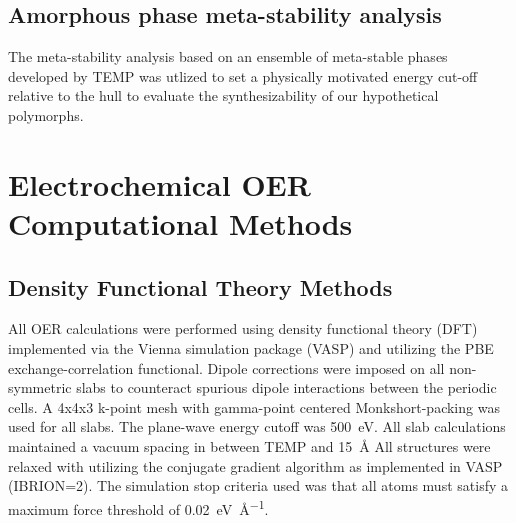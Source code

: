 



\subsection{Amorphous phase meta-stability analysis} %
%

%
The meta-stability analysis based on an ensemble of meta-stable phases developed by TEMP was utlized to set a physically motivated energy cut-off relative to the hull to evaluate the synthesizability of our hypothetical polymorphs.




\section{Electrochemical OER Computational Methods}  %
%

\subsection{Density Functional Theory Methods}  %
%
%
All OER calculations were performed using density functional theory (DFT) implemented via the Vienna  simulation package (VASP)
\cite{Kresse1995,Kresse1996_0,Kresse1996_1}
and utilizing the PBE exchange-correlation functional\cite{Perdew1996}.
%
Dipole corrections were imposed on all non-symmetric slabs to counteract spurious dipole interactions between the periodic cells.\cite{Neugebauer1992}
%
A 4x4x3 k-point mesh with gamma-point centered Monkshort-packing\cite{Monkhorst1976} was used for all slabs.
%
The plane-wave energy cutoff was \SI{500}{\electronvolt}.
%
All slab calculations maintained a vacuum spacing in between TEMP and \SI{15}{\angstrom}
%
All structures were relaxed with utilizing the conjugate gradient algorithm as implemented in VASP (IBRION\num{=2}).
%
The simulation stop criteria used was that all atoms must satisfy a maximum force threshold of \SI{0.02}{\electronvolt\per\angstrom}.


